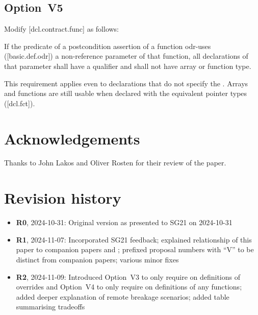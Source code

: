 \subsection*{Option~V5}

Modify [dcl.contract.func] as follows:

\begin{adjustwidth}{0.5cm}{0.5cm}
If the predicate of a postcondition assertion of a function odr-uses ([basic.def.odr]) a
non-reference parameter of that function, all declarations of that parameter shall have a  qualifier and
shall not have array or function type.
\begin{note}
This requirement applies even to declarations
that do not specify the . Arrays and functions are still usable when declared with the equivalent pointer types ([dcl.fct]).
\end{note}
\begin{example}
\tcode{[...]}
\end{example}

\end{adjustwidth}


\section*{Acknowledgements}

Thanks to John Lakos and Oliver Rosten for their review of the paper.


\section*{Revision history}

\begin{itemize}
\item \textbf{R0}, 2024-10-31: Original version as presented to SG21 on 2024-10-31
\item \textbf{R1}, 2024-11-07: Incorporated SG21 feedback; explained relationship of this paper to companion papers \cite{P3487R0} and \cite{P3489R0}; prefixed proposal numbers with ``V'' to be distinct from companion papers; various minor fixes
\item \textbf{R2}, 2024-11-09: Introduced Option~V3 to only require  on definitions of overrides and Option~V4 to only require  on definitions of any functions; added deeper explanation of remote breakage scenarios; added table summarising tradeoffs
\end{itemize}

